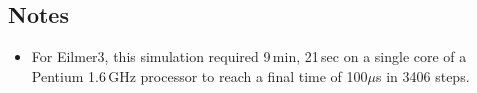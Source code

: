 \noindent
\topbar

\bottombar

\noindent
\topbar

\bottombar

\noindent
\topbar

\bottombar

\subsection{Notes}
\begin{itemize}
\item For Eilmer3, this simulation required 9\,min, 21\,sec on a single core of 
  a Pentium 1.6\,GHz processor to reach a final time of 100$\mu$s in 3406 steps.
\end{itemize}
